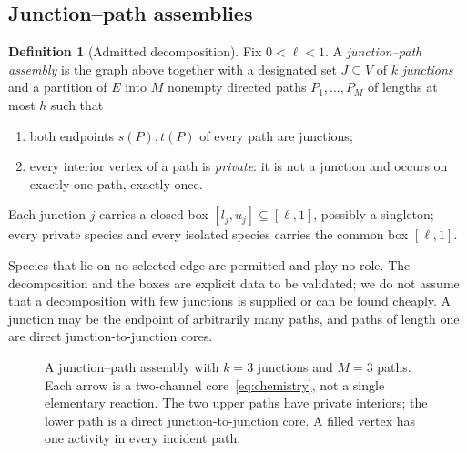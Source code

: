 \documentclass[11pt,a4paper]{article}
\theoremstyle{plain}
\theoremstyle{definition}
\newtheorem{definition}[theorem]{Definition}
\theoremstyle{remark}
\begin{document}
\subsection{Junction--path assemblies}

\begin{definition}[Admitted decomposition]\label{def:class}
Fix $0<\ell<1$. A \emph{junction--path assembly} is the graph above together with a designated set $J\subseteq V$ of $k$ \emph{junctions} and a partition of $E$ into $M$ nonempty directed paths $P_1,\dots,P_M$ of lengths at most $h$ such that
\begin{enumerate}[label=(\roman*)]
\item both endpoints $s(P),t(P)$ of every path are junctions;
\item every interior vertex of a path is \emph{private}: it is not a junction and occurs on exactly one path, exactly once.
\end{enumerate}
Each junction $j$ carries a closed box $[l_j,u_j]\subseteq[\ell,1]$, possibly a singleton; every private species and every isolated species carries the common box $[\ell,1]$.
\end{definition}

Species that lie on no selected edge are permitted and play no role. The decomposition and the boxes are explicit data to be validated; we do not assume that a decomposition with few junctions is supplied or can be found cheaply. A junction may be the endpoint of arbitrarily many paths, and paths of length one are direct junction-to-junction cores.

\begin{figure}[t]
\centering
{}
\caption{A junction--path assembly with $k=3$ junctions and $M=3$ paths. Each arrow is a two-channel core~\eqref{eq:chemistry}, not a single elementary reaction. The two upper paths have private interiors; the lower path is a direct junction-to-junction core. A filled vertex has one activity in every incident path.}
\label{fig:topology}
\end{figure}
\end{document}
